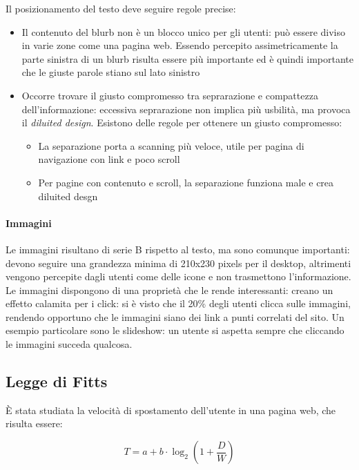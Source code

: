 Il posizionamento del testo deve seguire regole precise:
\begin{itemize}

\item Il contenuto del blurb non \`e un blocco unico per gli utenti: pu\`o essere diviso in varie zone come una pagina web. Essendo percepito assimetricamente la parte sinistra di un blurb risulta essere pi\`u importante ed \`e quindi importante che le giuste parole stiano sul lato sinistro
\item Occorre trovare il giusto compromesso tra seprarazione e compattezza dell'informazione: eccessiva seprarazione non implica pi\`u usbilit\`a, ma provoca il \textit{diluited design}. Esistono delle regole per ottenere un giusto compromesso:
  \begin{itemize}

  \item La separazione porta a scanning pi\`u veloce, utile per pagina di navigazione con link e poco scroll
  \item Per pagine con contenuto e scroll, la separazione funziona male e crea diluited desgn

  \end{itemize}

\end{itemize}

\paragraph*{Immagini}Le immagini risultano di serie B rispetto al testo, ma sono comunque importanti: devono seguire una grandezza minima di 210x230 pixels per il desktop, altrimenti vengono percepite dagli utenti come delle icone e non trasmettono l'informazione.
Le immagini dispongono di una propriet\`a che le rende interessanti: creano un effetto calamita per i click: si \`e visto che il 20\% degli utenti clicca sulle immagini, rendendo opportuno che le immagini siano dei link a punti correlati del sito. Un esempio particolare sono le slideshow: un utente si aspetta sempre che cliccando le immagini succeda qualcosa.

\subsection{Legge di Fitts}

\`E stata studiata la velocit\`a di spostamento dell'utente in una pagina web, che risulta essere:

\[ T=a+b \cdot \log_2 {(1+ \frac{D}{W})} \]

